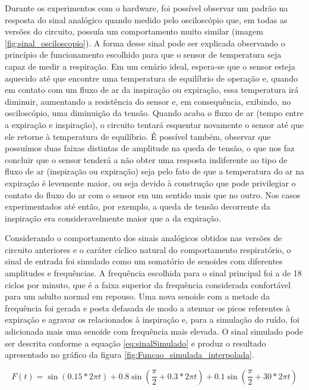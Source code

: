 Durante os experimentos com o hardware, foi possível observar um padrão na resposta do sinal analógico quando medido pelo osciloscópio que, em todas as versões do circuito, possuía um comportamento muito similar (imagem \ref{fig:sinal_osciloscopio}). A forma desse sinal pode ser explicada observando o princípio de funcionamento escolhido para que o sensor de temperatura seja capaz de medir a respiração. Em um cenário ideal, espera-se que o sensor esteja aquecido até que encontre uma temperatura de equilíbrio de operação e, quando em contato com um fluxo de ar da inspiração ou expiração, essa temperatura irá diminuir, aumentando a resistência do sensor e, em consequência, exibindo, no osciloscópio, uma diminuição da tensão. Quando acaba o fluxo de ar (tempo entre a expiração e inspiração), o circuito tentará esquentar novamente o sensor até que ele retorne à temperatura de equilíbrio. É possível também, observar que possuímos duas faixas distintas de amplitude na queda de tensão, o que nos faz concluir que o sensor tenderá a não obter uma resposta indiferente ao tipo de fluxo de ar (inspiração ou expiração) seja pelo fato de que a temperatura do ar na expiração é levemente maior, ou seja devido à construção que pode privilegiar o contato do fluxo do ar com o sensor em um sentido mais que no outro. Nos casos experimentados até então, por exemplo, a queda de tensão decorrente da inspiração era consideravelmente maior que a da expiração.


Considerando o comportamento dos sinais analógicos obtidos nas versões de circuito anteriores e o caráter cíclico natural do comportamento respiratório, o sinal de entrada foi simulado como um somatório de senoides com diferentes amplitudes e frequências. A frequência escolhida para o sinal principal foi a de 18 ciclos por minuto, que é a faixa superior da frequência considerada confortável para um adulto normal em repouso. Uma nova senoide com a metade da frequência foi gerada e posta defasada de modo a atenuar os picos referentes à expiração e agravar os relacionados à inspiração e, para a simulação do ruído, foi adicionada mais uma senoide com frequência mais elevada. O sinal simulado pode ser descrita conforme a equação \ref{eq:sinalSimulado} e produz o resultado apresentado no gráfico da figura \ref{fig:Funcao_simulada_interpolada}.

\begin{equation} \label{eq:sinalSimulado}
	F(t) =  \sin(0.15 * 2\pi t)  + 0.8\sin(\dfrac{\pi}{2} + 0.3 * 2\pi t) + 0.1\sin(\dfrac{\pi}{2} + 30 * 2\pi t)
\end{equation}


